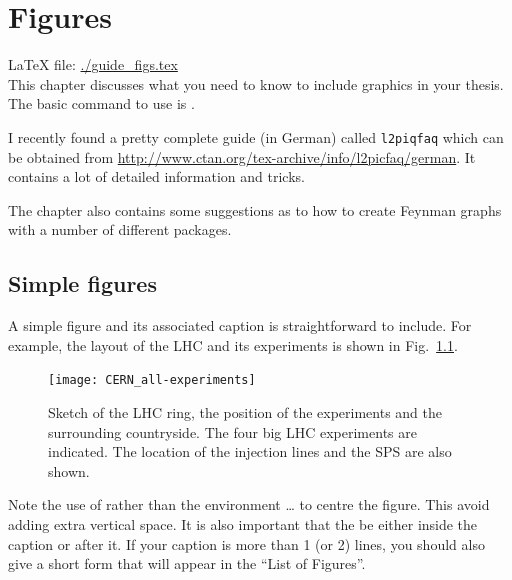 
\chapter{Figures}
\label{sec:fig}

\LaTeX{} file: \url{./guide_figs.tex}\\[1ex]
\noindent
This chapter discusses what you need to know to include graphics in
your thesis. The basic command to use is .

I recently found a pretty complete guide (in German) called \texttt{l2piqfaq}
which can be obtained from
\url{http://www.ctan.org/tex-archive/info/l2picfaq/german}. It contains
a lot of detailed information and tricks.

The chapter also contains some suggestions as to how to create Feynman
graphs with a number of different packages.

\section{Simple figures}
\label{sec:fig:simple}

A simple figure and its associated caption is straightforward to
include. For example, the layout of the LHC and its experiments is
shown in Fig.~\ref{fig:LHC}.

\begin{figure}[htbp]
  \centering
  \texttt{[image: CERN\_all-experiments]}
  \caption[Sketch of the LHC ring, the position of the experiments and
  the surrounding countryside.]{Sketch of the LHC ring, the position
    of the experiments and the surrounding countryside. The four big
    LHC experiments are indicated. The location of the injection lines
    and the SPS are also shown.}
  \label{fig:LHC}
\end{figure}

Note the use of  rather than the environment
 \ldots {} to centre the figure. This
avoid adding extra vertical space. It is also important that the
 be either inside the caption or after it. If your
caption is more than 1 (or 2) lines, you should also give a short form
that will appear in the ``List of Figures''.

